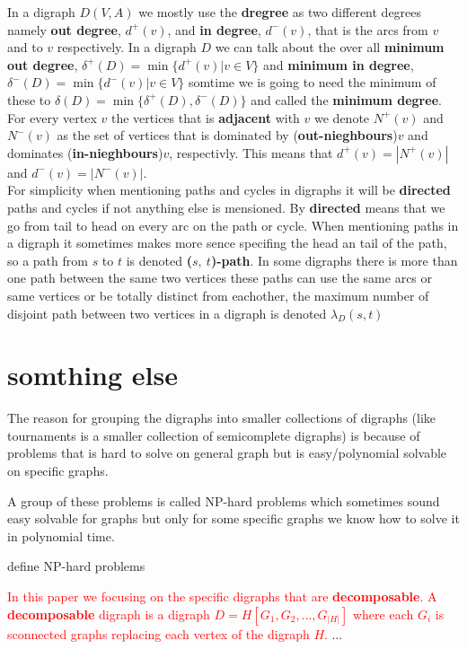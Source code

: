 In a digraph $D(V,A)$ we mostly use the \textbf{dregree} as two different degrees namely \textbf{out degree}, $d^+(v)$, and \textbf{in degree}, $d^-(v)$, that is the arcs from $v$ and to $v$ respectively. 
In a digraph $D$ we can talk about the over all \textbf{minimum out degree}, $\delta ^+(D)=\min\lbrace d^+(v)|v\in V\rbrace$ and \textbf{minimum in degree}, $\delta ^-(D)=\min\lbrace d^-(v)|v\in V\rbrace$
somtime we is going to need the minimum of these to $\delta(D)=\min \lbrace\delta ^+(D),\delta ^-(D) \rbrace$ and called the \textbf{minimum degree}.
For every vertex $v$ the vertices that is \textbf{adjacent} with $v$ we denote $N^+(v)$ and $N^-(v)$ as the set of vertices that is dominated by (\textbf{out-nieghbours})$v$ and dominates (\textbf{in-nieghbours})$v$, respectivly. 
This means that $d^+(v)=|N^+(v)|$ and $d^-(v)=|N^-(v)|$.\\
For simplicity when mentioning paths and cycles in digraphs it will be \textbf{directed} paths and cycles if not anything else is mensioned. 
By \textbf{directed} means that we go from tail to head on every arc on the path or cycle.
When mentioning paths in a digraph it sometimes makes more sence specifing the head an tail of the path, so a path from $s$ to $t$ is denoted \textbf{($s,\ t$)-path}.
In some digraphs there is more than one path between the same two vertices these paths can use the same arcs or same vertices or be totally distinct from eachother, the maximum number of disjoint path between two vertices in a digraph is denoted $\lambda_D(s,t)$
 





\section{somthing else}
The reason for grouping the digraphs into smaller collections of digraphs (like tournaments is a smaller collection of semicomplete digraphs) is because of problems that is hard to solve on general graph but is easy/polynomial solvable on specific graphs.

A group of these problems is called NP-hard problems which sometimes sound easy solvable for graphs but only for some specific graphs we know how to solve it in polynomial time. 
\begin{definition}
    define NP-hard problems
\end{definition}

\textcolor{red}{In this paper we focusing on the specific digraphs that are \textbf{decomposable}. 
A \textbf{decomposable} digraph is a digraph $D=H[G_1,G_2,\dots,G_|H|]$ where each $G_i$ is sconnected graphs replacing each vertex of the digraph $H$.} ...
